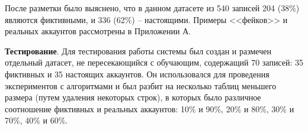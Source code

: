 После разметки было выяснено, что в данном датасете из 540 записей 204 (38\%) являются фиктивными, и 336 (62\%) -- настоящими. Примеры <<фейков>> и реальных аккаунтов рассмотрены в Приложении А.

\textbf{Тестирование}. Для тестирования работы системы был создан и размечен отдельный датасет, не пересекающийся с обучающим, содержащий 70 записей: 35 фиктивных и 35 настоящих аккаунтов. Он использовался для проведения экспериментов с алгоритмами и был разбит на несколько таблиц меньшего размера (путем удаления некоторых строк), в которых было различное соотношение фиктивных и реальных аккаунтов: 10\% и 90\%, 20\% и 80\%, 30\% и 70\%, 40\% и 60\%.


